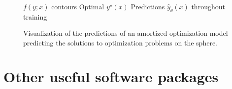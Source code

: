 \begin{figure}
  \begin{center}
     $f(y; x)$ contours \;
     Optimal $y^\star(x)$ \;
     Predictions $\hat y_\theta(x)$ throughout training
  \end{center}
  \vspace{-3mm}
  \caption{Visualization of the predictions of an amortized
    optimization model predicting the solutions
    to optimization problems on the sphere.}
  \label{fig:sphere}
\end{figure}

\section{Other useful software packages}
\label{sec:impl:software}

